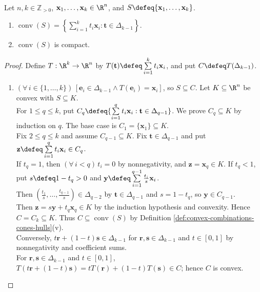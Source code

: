 \begin{proposition} \label{prop:convex-hull-finite-set-combinations-compact} \\
Let $n,k\in\mathbb{Z}_{>0}$, $\mathbf{x}_1,\ldots,\mathbf{x}_k\in\R^n$, and $S\defeq\{\mathbf{x}_1,\ldots,\mathbf{x}_k\}$.
\begin{enumerate}[label=(\roman*)]
\setlength{\itemsep}{0pt}
\item $\operatorname{conv}(S)=\left\{\sum\limits_{i=1}^{k}t_i\mathbf{x}_i:\mathbf{t}\in\Delta_{k-1}\right\}$.
\item $\operatorname{conv}(S)$ is compact.
\end{enumerate}
\begin{proof}
Define $T:\R^k\to\R^n$ by $T(\mathbf{t})\defeq\sum\limits_{i=1}^{k}t_i\mathbf{x}_i$, and put $C\defeq T(\Delta_{k-1})$.
\begin{enumerate}[label=(\roman*)]
\setlength{\itemsep}{0pt}
\item $(\forall\,i\in\{1,\ldots,k\})\,[\mathbf{e}_i\in\Delta_{k-1}\land T(\mathbf{e}_i)=\mathbf{x}_i]$, so $S\subseteq C$. Let $K\subseteq\R^n$ be convex with $S\subseteq K$.\\
For $1\leq q\leq k$, put $C_q\defeq\{\sum\limits_{i=1}^{q}t_i\mathbf{x}_i:\mathbf{t}\in\Delta_{q-1}\}$. We prove $C_q\subseteq K$ by induction on $q$. The base case is $C_1=\{\mathbf{x}_1\}\subseteq K$.\\
Fix $2\leq q\leq k$ and assume $C_{q-1}\subseteq K$. Fix $\mathbf{t}\in\Delta_{q-1}$ and put $\mathbf{z}\defeq\sum\limits_{i=1}^{q}t_i\mathbf{x}_i\in C_q$.\\
If $t_q=1$, then $(\forall\,i<q)\,t_i=0$ by nonnegativity, and $\mathbf{z}=\mathbf{x}_q\in K$. If $t_q<1$, put $s\defeq1-t_q>0$ and $\mathbf{y}\defeq\sum\limits_{i=1}^{q-1}\frac{t_i}{s}\mathbf{x}_i$.\\
Then $(\frac{t_1}{s},\ldots,\frac{t_{q-1}}{s})\in\Delta_{q-2}$ by $\mathbf{t}\in\Delta_{q-1}$ and $s=1-t_q$, so $\mathbf{y}\in C_{q-1}$.\\
Then $\mathbf{z}=s\mathbf{y}+t_q\mathbf{x}_q\in K$ by the induction hypothesis and convexity. Hence $C=C_k\subseteq K$. Thus $C\subseteq\operatorname{conv}(S)$ by Definition \ref{def:convex-combinations-cones-hulls}(v).\\
Conversely, $t\mathbf{r}+(1-t)\mathbf{s}\in\Delta_{k-1}$ for $\mathbf{r},\mathbf{s}\in\Delta_{k-1}$ and $t\in[0,1]$ by nonnegativity and coefficient sums.\\
For $\mathbf{r},\mathbf{s}\in\Delta_{k-1}$ and $t\in[0,1]$, $T(t\mathbf{r}+(1-t)\mathbf{s})=tT(\mathbf{r})+(1-t)T(\mathbf{s})\in C$; hence $C$ is convex.\\

\end{enumerate}
\end{proof}
\end{proposition}
